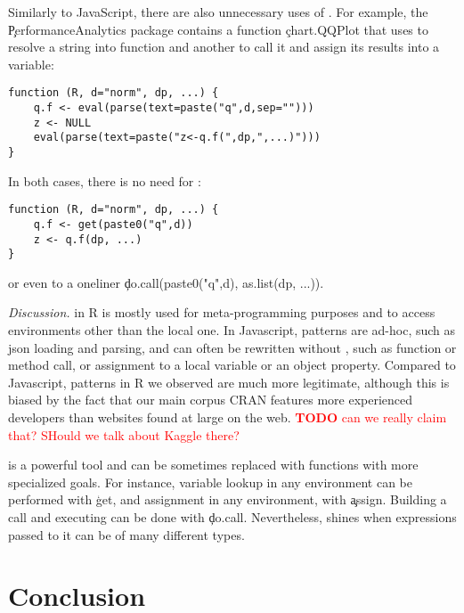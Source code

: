 \documentclass[review,screen,acmsmall,anonymous=true]{acmart}
\newcommand{\mypara}[1]{\medskip\noindent\emph{#1}\xspace}
\newcommand{\authorcomment}[3]{\xspace\textcolor{#1}{{\bf #2} #3}\xspace}
\newcommand{\todo}[1]{\authorcomment{red}{TODO}{#1}}
\begin{document}
Similarly to JavaScript, there are also unnecessary uses of \eval. For example,
the \c{PerformanceAnalytics} package contains a function \c{chart.QQPlot} that
uses \eval to resolve a string into function and another to call it and assign
its results into a variable:
\begin{lstlisting}
function (R, d="norm", dp, ...) {
	q.f <- eval(parse(text=paste("q",d,sep="")))
	z <- NULL
	eval(parse(text=paste("z<-q.f(",dp,",...)")))
}
\end{lstlisting}
  In both cases, there is no need for \eval:
\begin{lstlisting}
function (R, d="norm", dp, ...) {
	q.f <- get(paste0("q",d))
	z <- q.f(dp, ...)
}
\end{lstlisting}
or even to a oneliner \c{do.call(paste0("q",d), as.list(dp, ...))}.


\mypara{Discussion.} \Eval in R is mostly used for meta-programming purposes and to access environments other than the local one. In Javascript, patterns are ad-hoc, such as json loading and parsing, and can often be rewritten without \eval, such as function or method call, or assignment to a local variable or an object property. Compared to Javascript, \eval patterns in R we observed are much more legitimate, although this is biased by the fact that our main corpus CRAN features more experienced developers than  websites found at large on the web. \todo{can we really claim that? SHould we talk about Kaggle there?}

\eval is a powerful tool and can be sometimes replaced with functions with more specialized goals. For instance, variable lookup in any environment can be performed with \c{get}, and assignment in any environment, with \c{assign}. Building a call and executing can be done with \c{do.call}. Nevertheless, \eval shines when expressions passed to it can be of many different types. %

\section{Conclusion}
\end{document}
